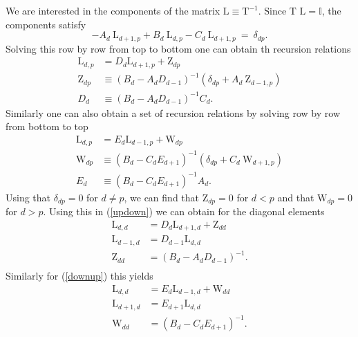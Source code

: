 \documentclass[]{article}
\begin{document}
We are interested in the components of the matrix $\text{L} \equiv \text{T}^{-1}$. Since $\text{T L} = \mathbb{I}$, the components satisfy
\begin{equation}
-A_{d} \ \text{L}_{d+1,p} + B_{d} \ \text{L}_{d,p}  -C_{d} \ \text{L}_{d+1,p} \ = \ \delta_{dp}.
\end{equation}
Solving this row by row from top to bottom one can obtain th recursion relations
\begin{equation}
\begin{split}
\text{L}_{d,p} &= D_{d} \text{L}_{d+1,p} + \text{Z}_{dp} \\
\text{Z}_{dp} &\equiv \left( B_{d} - A_{d} D_{d-1} \right)^{-1} \left( \delta_{dp} + A_{d} \ \text{Z}_{d-1,p} \right) \\
D_{d} &\equiv \left( B_{d} - A_{d} D_{d-1} \right)^{-1} C_{d} .
\end{split}
\label{updown}
\end{equation}
Similarly one can also obtain a set of recursion relations by solving row by row from bottom to top
\begin{equation}
\begin{split}
\text{L}_{d,p} &= E_{d} \text{L}_{d-1,p} + \text{W}_{dp} \\
\text{W}_{dp} &\equiv \left( B_{d} - C_{d} E_{d+1} \right)^{-1} \left( \delta_{dp} + C_{d} \ \text{W}_{d+1,p} \right) \\
E_{d} &\equiv \left( B_{d} - C_{d} E_{d+1} \right)^{-1} A_{d} .
\end{split}
\label{downup}
\end{equation}
Using that $\delta_{dp} = 0$ for $d\neq p$, we can find that $\text{Z}_{dp}=0$ for $d<p$ and that $\text{W}_{dp}=0$ for $d>p$. Using this in (\ref{updown}) we can obtain for the diagonal elements
\begin{equation}
\begin{split}
\text{L}_{d,d} &= D_{d} \text{L}_{d+1,d} + \text{Z}_{dd} \\
\text{L}_{d-1,d} &= D_{d-1} \text{L}_{d,d} \\
\text{Z}_{dd} &= \left( B_{d} - A_{d} D_{d-1} \right)^{-1}. \\
\end{split}
\end{equation}
Similarly for (\ref{downup}) this yields
\begin{equation}
\begin{split}
\text{L}_{d,d} &= E_{d} \text{L}_{d-1,d} + \text{W}_{dd} \\
\text{L}_{d+1,d} &= E_{d+1} \text{L}_{d,d} \\
\text{W}_{dd} &= \left( B_{d} - C_{d} E_{d+1} \right)^{-1}. \\
\end{split}
\end{equation}
\end{document}
